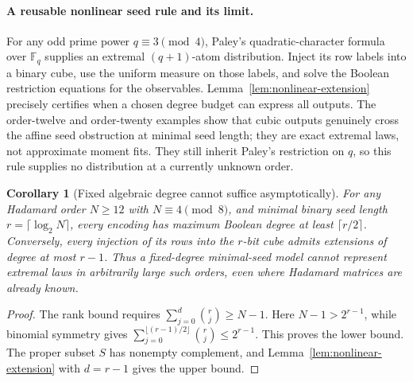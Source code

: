 \documentclass[11pt]{article}
\newtheorem{corollary}[theorem]{Corollary}
\begin{document}
\paragraph{A reusable nonlinear seed rule and its limit.}
For any odd prime power $q\equiv3\pmod4$, Paley's quadratic-character
formula over $\mathbb F_q$ supplies an extremal $(q+1)$-atom distribution.
Inject its row labels into a binary cube, use the uniform measure on
those labels, and solve the Boolean restriction equations for the
observables. Lemma~\ref{lem:nonlinear-extension} precisely certifies when
a chosen degree budget can express all outputs. The order-twelve and
order-twenty examples show that cubic outputs genuinely cross the affine
seed obstruction at minimal seed length; they are exact extremal laws,
not approximate moment fits. They still inherit Paley's restriction on
$q$, so this rule supplies no distribution at a currently unknown order.

\begin{corollary}[Fixed algebraic degree cannot suffice asymptotically]
\label{cor:nonlinear-growing-degree}
For any Hadamard order $N\ge12$ with $N\equiv4\pmod8$, and minimal
binary seed length $r=\lceil\log_2N\rceil$, every encoding has maximum
Boolean degree at least $\lceil r/2\rceil$. Conversely, every injection
of its rows into the $r$-bit cube admits extensions of degree at most
$r-1$. Thus a fixed-degree minimal-seed model cannot represent extremal
laws in arbitrarily large such orders, even where Hadamard matrices
are already known.
\end{corollary}
\begin{proof}
The rank bound requires $\sum_{j=0}^d\binom rj\ge N-1$.
Here $N-1>2^{r-1}$, while binomial symmetry gives
$\sum_{j=0}^{\lfloor(r-1)/2\rfloor}\binom rj\le2^{r-1}$.
This proves the lower bound. The proper subset $S$ has nonempty
complement, and Lemma~\ref{lem:nonlinear-extension} with $d=r-1$
gives the upper bound.
\end{proof}
\end{document}
